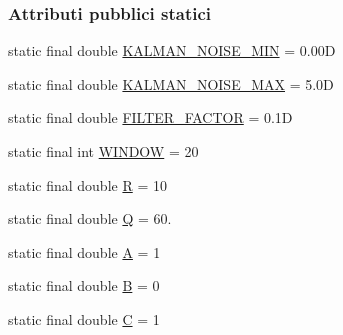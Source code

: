 \subsubsection*{Attributi pubblici statici}
\begin{DoxyCompactItemize}
\item 
static final double \hyperlink{classit_1_1unibo_1_1torsello_1_1bluetoothpositioning_1_1constant_1_1KFilterConstansts_a5a45dca525813a3df9715cdf5878c289_a5a45dca525813a3df9715cdf5878c289}{K\+A\+L\+M\+A\+N\+\_\+\+N\+O\+I\+S\+E\+\_\+\+M\+IN} = 0.\+00D
\item 
static final double \hyperlink{classit_1_1unibo_1_1torsello_1_1bluetoothpositioning_1_1constant_1_1KFilterConstansts_af9b79f0b652105f894aa866ad8ae50f1_af9b79f0b652105f894aa866ad8ae50f1}{K\+A\+L\+M\+A\+N\+\_\+\+N\+O\+I\+S\+E\+\_\+\+M\+AX} = 5.\+0D
\item 
static final double \hyperlink{classit_1_1unibo_1_1torsello_1_1bluetoothpositioning_1_1constant_1_1KFilterConstansts_a9bc0f7f81fcbb7e9c18179df0d673e5b_a9bc0f7f81fcbb7e9c18179df0d673e5b}{F\+I\+L\+T\+E\+R\+\_\+\+F\+A\+C\+T\+OR} = 0.\+1D
\item 
static final int \hyperlink{classit_1_1unibo_1_1torsello_1_1bluetoothpositioning_1_1constant_1_1KFilterConstansts_aa33874174f7be9055504e154cb6b4baf_aa33874174f7be9055504e154cb6b4baf}{W\+I\+N\+D\+OW} = 20
\item 
static final double \hyperlink{classit_1_1unibo_1_1torsello_1_1bluetoothpositioning_1_1constant_1_1KFilterConstansts_aeebad8c471f2bcdf3328325cb548e429_aeebad8c471f2bcdf3328325cb548e429}{R} = 10
\item 
static final double \hyperlink{classit_1_1unibo_1_1torsello_1_1bluetoothpositioning_1_1constant_1_1KFilterConstansts_aa5bde73a61e5616d3217bdaf87fc6e78_aa5bde73a61e5616d3217bdaf87fc6e78}{Q} = 60.
\item 
static final double \hyperlink{classit_1_1unibo_1_1torsello_1_1bluetoothpositioning_1_1constant_1_1KFilterConstansts_a6696f4c8bc06209b08dd308248b2b048_a6696f4c8bc06209b08dd308248b2b048}{A} = 1
\item 
static final double \hyperlink{classit_1_1unibo_1_1torsello_1_1bluetoothpositioning_1_1constant_1_1KFilterConstansts_a6fbe3fca27e3c7ef2df6aa9867685ff1_a6fbe3fca27e3c7ef2df6aa9867685ff1}{B} = 0
\item 
static final double \hyperlink{classit_1_1unibo_1_1torsello_1_1bluetoothpositioning_1_1constant_1_1KFilterConstansts_a4358950bbe93132edc3683ef9920a8a9_a4358950bbe93132edc3683ef9920a8a9}{C} = 1
\item 

\end{DoxyCompactItemize}
